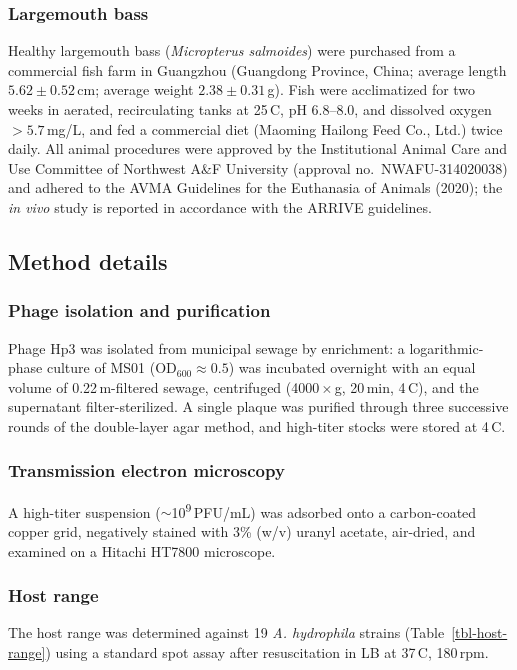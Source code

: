 \subsubsection*{Largemouth bass}
Healthy largemouth bass (\emph{Micropterus salmoides}) were purchased from a
commercial fish farm in Guangzhou (Guangdong Province, China; average length
$5.62 \pm 0.52$\,cm; average weight $2.38 \pm 0.31$\,g). Fish were acclimatized for
two weeks in aerated, recirculating tanks at 25\,\textdegree C, pH 6.8--8.0, and
dissolved oxygen $>5.7$\,mg/L, and fed a commercial diet (Maoming Hailong Feed
Co., Ltd.) twice daily. All animal procedures were approved by the Institutional
Animal Care and Use Committee of Northwest A\&F University (approval no.\
NWAFU-314020038) and adhered to the AVMA Guidelines for the Euthanasia of Animals
(2020); the \emph{in vivo} study is reported in accordance with the ARRIVE
guidelines.

\subsection*{Method details}

\subsubsection*{Phage isolation and purification}
Phage Hp3 was isolated from municipal sewage by enrichment: a logarithmic-phase
culture of MS01 ($\mathrm{OD}_{600} \approx 0.5$) was incubated overnight with an
equal volume of 0.22\,\textmu m-filtered sewage, centrifuged (4000\,$\times$\,g,
20\,min, 4\,\textdegree C), and the supernatant filter-sterilized. A single plaque
was purified through three successive rounds of the double-layer agar method, and
high-titer stocks were stored at 4\,\textdegree C.

\subsubsection*{Transmission electron microscopy}
A high-titer suspension ($\sim$10\textsuperscript{9}\,PFU/mL) was adsorbed onto a
carbon-coated copper grid, negatively stained with 3\% (w/v) uranyl acetate,
air-dried, and examined on a Hitachi HT7800 microscope.

\subsubsection*{Host range}
The host range was determined against 19 \emph{A. hydrophila} strains
(Table~\ref{tbl-host-range}) using a standard spot assay after resuscitation in LB
at 37\,\textdegree C, 180\,rpm.

